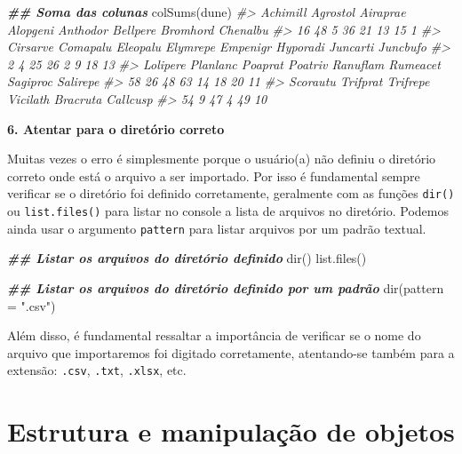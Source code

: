 \documentclass[
]{book}
\newenvironment{Shaded}{\begin{snugshade}}{\end{snugshade}}
\newcommand{\AttributeTok}[1]{\textcolor[rgb]{0.61,0.61,0.61}{#1}}
\newcommand{\CommentTok}[1]{\textcolor[rgb]{0.37,0.37,0.37}{\textit{#1}}}
\newcommand{\DocumentationTok}[1]{\textcolor[rgb]{0.37,0.37,0.37}{\textbf{\textit{#1}}}}
\newcommand{\FunctionTok}[1]{\textcolor[rgb]{0,0,0}{#1}}
\newcommand{\NormalTok}[1]{#1}
\newcommand{\StringTok}[1]{\textcolor[rgb]{0.5,0.5,0.5}{#1}}
\begin{document}
\begin{Shaded}
\begin{Highlighting}[]
\DocumentationTok{\#\# Soma das colunas}
\FunctionTok{colSums}\NormalTok{(dune)}
\CommentTok{\#\textgreater{} Achimill Agrostol Airaprae Alopgeni Anthodor Bellpere Bromhord Chenalbu }
\CommentTok{\#\textgreater{}       16       48        5       36       21       13       15        1 }
\CommentTok{\#\textgreater{} Cirsarve Comapalu Eleopalu Elymrepe Empenigr Hyporadi Juncarti Juncbufo }
\CommentTok{\#\textgreater{}        2        4       25       26        2        9       18       13 }
\CommentTok{\#\textgreater{} Lolipere Planlanc  Poaprat  Poatriv Ranuflam Rumeacet Sagiproc Salirepe }
\CommentTok{\#\textgreater{}       58       26       48       63       14       18       20       11 }
\CommentTok{\#\textgreater{} Scorautu Trifprat Trifrepe Vicilath Bracruta Callcusp }
\CommentTok{\#\textgreater{}       54        9       47        4       49       10}
\end{Highlighting}
\end{Shaded}

\textbf{6. Atentar para o diretório correto}

Muitas vezes o erro é simplesmente porque o usuário(a) não definiu o diretório correto onde está o arquivo a ser importado. Por isso é fundamental sempre verificar se o diretório foi definido corretamente, geralmente com as funções \texttt{dir()} ou \texttt{list.files()} para listar no console a lista de arquivos no diretório. Podemos ainda usar o argumento \texttt{pattern} para listar arquivos por um padrão textual.

\begin{Shaded}
\begin{Highlighting}[]
\DocumentationTok{\#\# Listar os arquivos do diretório definido}
\FunctionTok{dir}\NormalTok{()}
\FunctionTok{list.files}\NormalTok{()}

\DocumentationTok{\#\# Listar os arquivos do diretório definido por um padrão}
\FunctionTok{dir}\NormalTok{(}\AttributeTok{pattern =} \StringTok{".csv"}\NormalTok{)}
\end{Highlighting}
\end{Shaded}

Além disso, é fundamental ressaltar a importância de verificar se o nome do arquivo que importaremos foi digitado corretamente, atentando-se também para a extensão: \texttt{.csv}, \texttt{.txt}, \texttt{.xlsx}, etc.

\hypertarget{estrutura-e-manipulauxe7uxe3o-de-objetos}{%
\section{Estrutura e manipulação de objetos}\label{estrutura-e-manipulauxe7uxe3o-de-objetos}}
\end{document}
